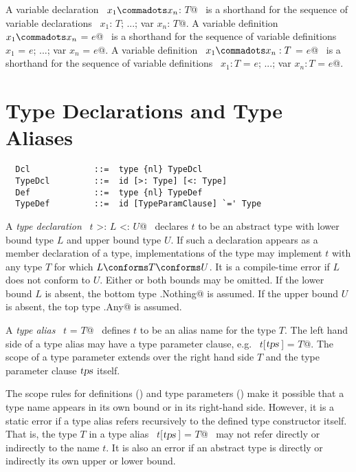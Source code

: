 A variable declaration ~\lstinline@var $x_1 \commadots x_n$: $T$@~
is a
shorthand for the sequence of variable declarations
~\lstinline@var $x_1$: $T$; ...; var $x_n$: $T$@.
A variable definition ~\lstinline@var $x_1 \commadots x_n$ = $e$@~
is a
shorthand for the sequence of variable definitions
~\lstinline@var $x_1$ = $e$; ...; var $x_n$ = $e$@.
A variable definition ~\lstinline@var $x_1 \commadots x_n: T$ = $e$@~
is a
shorthand for the sequence of variable definitions
~\lstinline@var $x_1: T$ = $e$; ...; var $x_n: T$ = $e$@.

\section{Type Declarations and Type Aliases}
\label{sec:typedcl}
\label{sec:typealias}

\syntax\begin{lstlisting}
  Dcl             ::=  type {nl} TypeDcl
  TypeDcl         ::=  id [>: Type] [<: Type]
  Def             ::=  type {nl} TypeDef
  TypeDef         ::=  id [TypeParamClause] `=' Type
\end{lstlisting}

A {\em type declaration} ~\lstinline@type $t$ >: $L$ <: $U$@~ declares
$t$ to be an abstract type with lower bound type $L$ and upper bound
type $U$.  If such a declaration appears as a member declaration of a
type, implementations of the type may implement $t$ with any type $T$
for which $L \conforms T \conforms U$. It is a compile-time error if
$L$ does not conform to $U$.  Either or both bounds may be omitted.
If the lower bound $L$ is absent, the bottom type
\lstinline@scala.Nothing@ is assumed.  If the upper bound $U$ is absent,
the top type \lstinline@scala.Any@ is assumed.

A {\em type alias} ~\lstinline@type $t$ = $T$@~ defines $t$ to be an alias
name for the type $T$.  The left hand side of a type alias may
have a type parameter clause, e.g. ~\lstinline@type $t$[$\mbox{\sl tps}\,$] = $T$@.  The scope
of a type parameter extends over the right hand side $T$ and the
type parameter clause $\mbox{\sl tps}$ itself.  

The scope rules for definitions () and type parameters
() make it possible that a type name appears in its
own bound or in its right-hand side.  However, it is a static error if
a type alias refers recursively to the defined type constructor itself.  
That is, the type $T$ in a type alias ~\lstinline@type $t$[$\mbox{\sl tps}\,$] = $T$@~ may not refer
directly or indirectly to the name $t$.  It is also an error if
an abstract type is directly or indirectly its own upper or lower bound.

